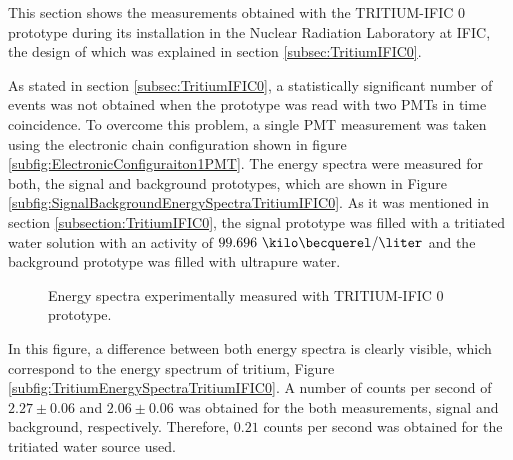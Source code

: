 This section shows the measurements obtained with the TRITIUM-IFIC 0 prototype during its installation in the Nuclear Radiation Laboratory at IFIC, the design of which was explained in section \ref{subsec:TritiumIFIC0}.

As stated in section \ref{subsec:TritiumIFIC0}, a statistically significant number of events was not obtained when the prototype was read with two PMTs in time coincidence. To overcome this problem, a single PMT measurement was taken using the electronic chain configuration shown in figure \ref{subfig:ElectronicConfiguraiton1PMT}. The energy spectra were measured for both, the signal and background prototypes, which are shown in Figure \ref{subfig:SignalBackgroundEnergySpectraTritiumIFIC0}. As it was mentioned in section \ref{subsection:TritiumIFIC0}, the signal prototype was filled with a tritiated water solution with an activity of $99.696~\kilo\becquerel/\liter$ and the background prototype was filled with ultrapure water.

\begin{figure}[h]
 \centering
   \newline
 \caption{Energy spectra experimentally measured with TRITIUM-IFIC 0 prototype.}
 \label{fig:EnergySpectraTRITIUMIFIC0}
\end{figure}


In this figure, a difference between both energy spectra is clearly visible, which correspond to the energy spectrum of tritium, Figure \ref{subfig:TritiumEnergySpectraTritiumIFIC0}. A number of counts per second of $2.27 \pm 0.06$ and $2.06 \pm 0.06$ was obtained for the both measurements, signal and background, respectively. Therefore, $0.21$ counts per second was obtained for the tritiated water source used.

